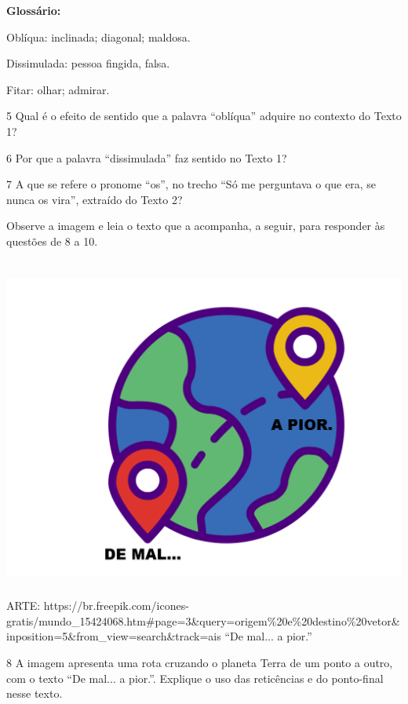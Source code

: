 \textbf{Glossário:}

Oblíqua: inclinada; diagonal; maldosa.

Dissimulada: pessoa fingida, falsa.

Fitar: olhar; admirar.

\num{5} Qual é o efeito de sentido que a palavra ``oblíqua'' adquire no
contexto do Texto 1?


\num{6} Por que a palavra ``dissimulada'' faz sentido no Texto 1?


\num{7} A que se refere o pronome ``os'', no trecho ``Só me perguntava o
que era, se nunca os vira'', extraído do Texto 2?


Observe a imagem e leia o texto que a acompanha, a seguir, para
responder às questões de 8 a 10.

\includegraphics[width=5.90556in,height=4.43889in]{./imgSAEB_6_POR/media/image11.png}
ARTE:
https://br.freepik.com/icones-gratis/mundo\_15424068.htm\#page=3\&query=origem\%20e\%20destino\%20vetor\&inposition=5\&from\_view=search\&track=ais
``De mal... a pior.''

\num{8} A imagem apresenta uma rota cruzando o planeta Terra de um ponto
a outro, com o texto ``De mal... a pior.''. Explique o uso das
reticências e do ponto-final nesse texto.

